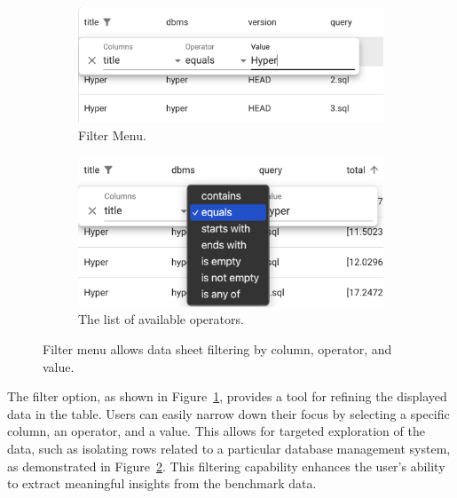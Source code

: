 \begin{figure}[h]
  \centering
  \begin{subfigure}[b]{0.4\linewidth}
      \includegraphics[width=\linewidth]{figures/data-viewer-filter.png}
      \caption{Filter Menu.}
      \label{fig:data-viewer-filter}
  \end{subfigure}
  \hspace{1cm} %
  \begin{subfigure}[b]{0.4\linewidth}
      \includegraphics[width=\linewidth]{figures/data-viewer-filter-operator.png}
      \caption{The list of available operators.}
      \label{fig:data-viewer-filter-operator}
  \end{subfigure}
  \caption{Filter menu allows data sheet filtering by column, operator, and value.}
  \label{fig:combined-figures}
\end{figure}

The filter option, as shown in Figure~\ref{fig:data-viewer-filter}, provides a tool for refining the displayed data in the table. Users can easily narrow down their focus by selecting a specific column, an operator, and a value. This allows for targeted exploration of the data, such as isolating rows related to a particular database management system, as demonstrated in Figure~\ref{fig:data-viewer-filter-operator}. This filtering capability enhances the user's ability to extract meaningful insights from the benchmark data.


